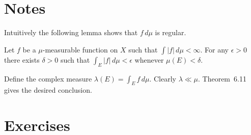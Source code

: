 


\section{Notes}

Intuitively the following lemma shows that \(f\,d\mu\) is regular.
\begin{llem} \label{llem:fdmu:abscont}
Let $f$ be a \(\mu\)-measurable function on $X$
such that \(\int|f|\,d\mu<\infty\).
For any \(\epsilon>0\) there exists \(\delta>0\) such that
\(\int_E |f|\,d\mu < \epsilon\) whenever \(\mu(E)<\delta\).
\end{llem}
\begin{thmproof}
Define the complex measure \(\lambda(E) = \int_E f\,d\mu\).
Clearly \(\lambda \ll \mu\). Theorem~6.11 gives the desired conclusion.
\end{thmproof}

\section{Exercises} %

